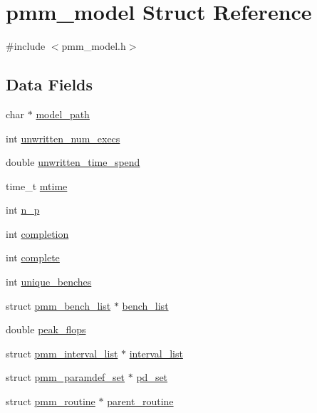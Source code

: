 \hypertarget{structpmm__model}{\section{pmm\-\_\-model Struct Reference}
\label{structpmm__model}
}


{\ttfamily \#include $<$pmm\-\_\-model.\-h$>$}

\subsection*{Data Fields}
\begin{DoxyCompactItemize}
\item 
char $\ast$ \hyperlink{structpmm__model_aba56fe203b7b1c2a19a7d1c29afae80f}{model\-\_\-path}
\item 
int \hyperlink{structpmm__model_a63d3fe02fc90ce9f48b6aae94ef25dfc}{unwritten\-\_\-num\-\_\-execs}
\item 
double \hyperlink{structpmm__model_a6a06f632cf4913a674b29808622dbd39}{unwritten\-\_\-time\-\_\-spend}
\item 
time\-\_\-t \hyperlink{structpmm__model_a74b64763a97bc359a4e0861010e090d3}{mtime}
\item 
int \hyperlink{structpmm__model_aa911d7af855c1a761fbcebd9545dc2c1}{n\-\_\-p}
\item 
int \hyperlink{structpmm__model_a8e6211f2cd32b0b31581241bb32a8190}{completion}
\item 
int \hyperlink{structpmm__model_a793e727d1ef15e739b140dacc5cea1f1}{complete}
\item 
int \hyperlink{structpmm__model_abcba0be210c29849b2594efb1dee7611}{unique\-\_\-benches}
\item 
struct \hyperlink{structpmm__bench__list}{pmm\-\_\-bench\-\_\-list} $\ast$ \hyperlink{structpmm__model_a024c61407d559a45ca20c076f732eb5c}{bench\-\_\-list}
\item 
double \hyperlink{structpmm__model_a71f976917c0db11c7a5a9b8efe0aaf93}{peak\-\_\-flops}
\item 
struct \hyperlink{structpmm__interval__list}{pmm\-\_\-interval\-\_\-list} $\ast$ \hyperlink{structpmm__model_a11a127e6d5d5c3c28ceceea2d3d31081}{interval\-\_\-list}
\item 
struct \hyperlink{structpmm__paramdef__set}{pmm\-\_\-paramdef\-\_\-set} $\ast$ \hyperlink{structpmm__model_a30f07ca77b7d593ec85bd1cc6d9ff1bc}{pd\-\_\-set}
\item 
struct \hyperlink{structpmm__routine}{pmm\-\_\-routine} $\ast$ \hyperlink{structpmm__model_a6a2335135513ba6f9bd43f56f9311431}{parent\-\_\-routine}
\end{DoxyCompactItemize}


